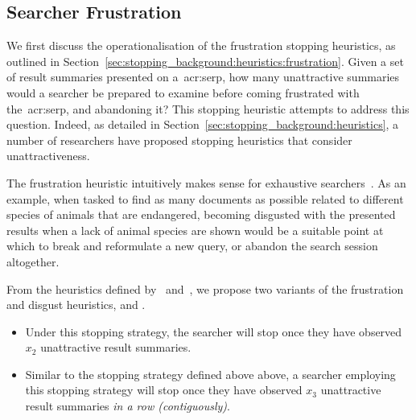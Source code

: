 \subsection{Searcher Frustration}\label{sec:strategies:frus_disg:frustration}
We first discuss the operationalisation of the frustration stopping heuristics, as outlined in Section~\ref{sec:stopping_background:heuristics:frustration}. Given a set of result summaries presented on a~\gls{acr:serp}, how many unattractive summaries would a searcher be prepared to examine before coming frustrated with the~\gls{acr:serp}, and abandoning it? This stopping heuristic attempts to address this question. Indeed, as detailed in Section~\ref{sec:stopping_background:heuristics}, a number of researchers have proposed stopping heuristics that consider unattractiveness.

The frustration heuristic intuitively makes sense for exhaustive searchers~\citep{kraft1979stopping_rules}. As an example, when tasked to find as many documents as possible related to different species of animals that are endangered, becoming disgusted with the presented results when a lack of animal species are shown would be a suitable point at which to break and reformulate a new query, or abandon the search session altogether.

From the heuristics defined by~\cite{cooper1973retrieval_effectiveness_ii} and~\cite{kraft1979stopping_rules}, we propose two variants of the frustration and disgust heuristics,  and .

\begin{itemize}
    \item{ Under this stopping strategy, the searcher will stop once they have observed $x_2$ unattractive result summaries.}
    
    \item{ Similar to the stopping strategy defined above above, a searcher employing this stopping strategy will stop once they have observed $x_3$ unattractive result summaries \emph{in a row (contiguously)}.}
\end{itemize}

